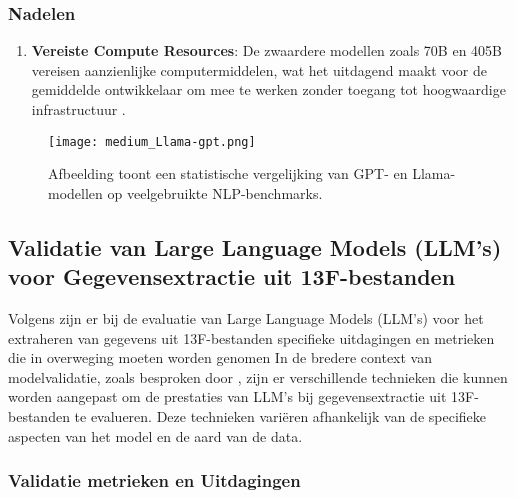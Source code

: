 \subsubsection{Nadelen}
\begin{enumerate}
    \item \textbf{Vereiste Compute Resources}: De zwaardere modellen zoals 70B en 405B vereisen aanzienlijke computermiddelen, wat het uitdagend maakt voor de gemiddelde ontwikkelaar om mee te werken zonder toegang tot hoogwaardige infrastructuur \autocite{meta}.
\end{enumerate}

\begin{figure}[hbt!]
    \texttt{[image: medium\_Llama-gpt.png]}
    \caption[13F voorbeeld 4]{\label{fig:gpt-versus-Llama-benchmarks} Afbeelding toont een statistische vergelijking van GPT- en Llama-modellen op veelgebruikte NLP-benchmarks. \autocite{ResearchGRaph2024}}
\end{figure}

\subsection{Validatie van Large Language Models (LLM's) voor Gegevensextractie uit 13F-bestanden}

Volgens \autocite{Huang2024} zijn er bij de evaluatie van Large Language Models (LLM's) voor het extraheren van gegevens uit 13F-bestanden specifieke uitdagingen en metrieken die in overweging moeten worden genomen
In de bredere context van modelvalidatie, zoals besproken door \textcite{Islam2024}, zijn er verschillende technieken die kunnen worden aangepast om de prestaties van LLM's bij gegevensextractie uit 13F-bestanden te evalueren. Deze technieken variëren afhankelijk van de specifieke aspecten van het model en de aard van de data.

\subsubsection{Validatie metrieken en Uitdagingen}
\label{sec:LLMValidation}

